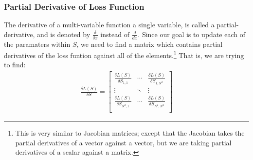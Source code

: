 \subsubsection{Partial Derivative of Loss Function}%
\label{ssub:derivative_of_loss_function}
The derivative of a multi-variable function \wrt{} a single variable, is called a partial-derivative, and is denoted by $\frac{\delta}{\delta x}$ instead of $\frac{d}{dx}$. Since our goal is to update each of the paramaters within $S$, we need to find a matrix which contains partial derivatives of the loss funtion against all of the elements.\footnote{This is very similar to Jacobian matrices; except that the Jacobian takes the partial derivatives of a vector against a vector, but we are taking partial derivatives of a scalar against a matrix.} That is, we are trying to find:
 \begin{align*}
         \frac{\delta L(S)}{\delta S}= \begin{bmatrix}
                 \frac{\delta L(S)}{\delta S_{1,1}}&\cdots &\frac{\delta L(S)}{\delta S_{1,N^2}}\\
                 \vdots &\ddots &\vdots \\
                 \frac{\delta L(S)}{\delta S_{N^2,1}}&\cdots &\frac{\delta L(S)}{\delta S_{N^2,N^2}}\\
         \end{bmatrix}
\end{align*}

